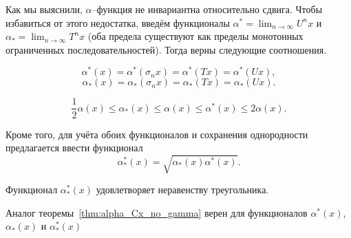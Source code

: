 Как мы выяснили, $\alpha$--функция не инвариантна относительно сдвига.
Чтобы избавиться от этого недостатка, введём функционалы
$
	\alpha^* = \lim_{n\to\infty} U^n x
$
и
$
	\alpha_* = \lim_{n\to\infty} T^n x
$
(оба предела существуют как пределы монотонных ограниченных последовательностей).
Тогда верны следующие соотношения.
\begin{lemma}
	\begin{equation}
		\alpha^*(x) = \alpha^*(\sigma_n x) = \alpha^*(Tx) = \alpha^*(Ux)
		,
	\end{equation}
	\begin{equation}
		\alpha_*(x) = \alpha_*(\sigma_n x) = \alpha_*(Tx) = \alpha_*(Ux)
		.
	\end{equation}
\end{lemma}

\begin{lemma}
	\begin{equation}
		\frac{1}{2} \alpha(x) \leq \alpha_*(x) \leq \alpha(x) \leq \alpha^*(x) \leq 2 \alpha(x)
		.
	\end{equation}
\end{lemma}

Кроме того, для учёта обоих функционалов и сохранения однородности предлагается ввести функционал
\begin{equation}
	\alpha_*^*(x) = \sqrt{\alpha_*(x)\alpha^*(x)}
	.
\end{equation}

\begin{hypothesis}
	Функционал $\alpha_*^*(x)$ удовлетворяет неравенству треугольника.
\end{hypothesis}

\begin{hypothesis}
	Аналог теоремы~\ref{thm:alpha_Cx_no_gamma} верен для функционалов
	$\alpha^*(x)$, $\alpha_*(x)$ и $\alpha_*^*(x)$
\end{hypothesis}
